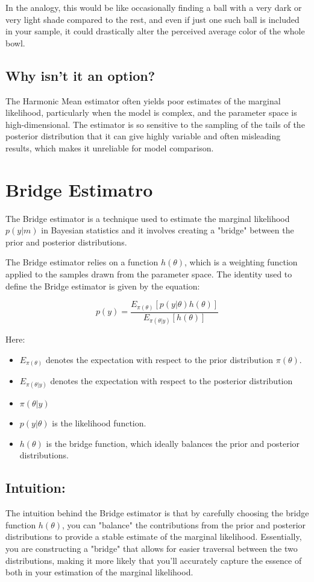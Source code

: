 \documentclass{article}
\begin{document}
In the analogy, this would be like occasionally finding a ball with a very dark or very light shade compared to the rest, and even if just one such ball is included in your sample, it could drastically alter the perceived average color of the whole bowl.

\subsection{Why isn't it an option?}
The Harmonic Mean estimator often yields poor estimates of the marginal likelihood, particularly when the model is complex, and the parameter space is high-dimensional. The estimator is so sensitive to the sampling of the tails of the posterior distribution that it can give highly variable and often misleading results, which makes it unreliable for model comparison.

\section{Bridge Estimatro}
The Bridge estimator is a technique used to estimate the marginal likelihood \( p(y|m) \) in Bayesian statistics and it involves creating a "bridge" between the prior and posterior distributions.

The Bridge estimator relies on a function \( h(\theta) \), which is a weighting function applied to the samples drawn from the parameter space. The identity used to define the Bridge estimator is given by the equation:

\[ p(y) = \frac{E_{\pi(\theta)}[p(y|\theta)h(\theta)]}{E_{\pi(\theta|y)}[h(\theta)]} \]

Here:
\begin{itemize}
    \item \( E_{\pi(\theta)} \) denotes the expectation with respect to the prior distribution \( \pi(\theta) \).
    \item \( E_{\pi(\theta|y)} \) denotes the expectation with respect to the posterior distribution 
    \item  \( \pi(\theta|y) \)
    \item \( p(y|\theta) \) is the likelihood function.
    \item \( h(\theta) \) is the bridge function, which ideally balances the prior and posterior distributions.
\end{itemize}

\subsection{Intuition:}
The intuition behind the Bridge estimator is that by carefully choosing the bridge function \( h(\theta) \), you can "balance" the contributions from the prior and posterior distributions to provide a stable estimate of the marginal likelihood. Essentially, you are constructing a "bridge" that allows for easier traversal between the two distributions, making it more likely that you'll accurately capture the essence of both in your estimation of the marginal likelihood.
\end{document}
